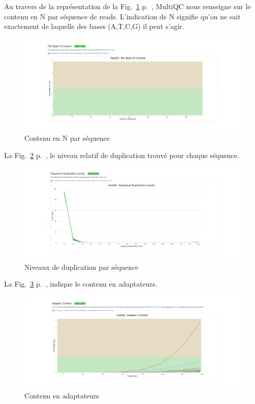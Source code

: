 \documentclass[a4paper,11pt]{article}
\begin{document}
Au travers de la représentation de la Fig.~\ref{fig-MultiQC_Plots5}
p.~\pageref{fig-MultiQC_Plots5}, MultiQC nous renseigne sur le contenu
en \og{}N\fg{} par séquence de reads. L'indication de N signifie qu'on
ne sait exactement de laquelle des bases (A,T,C,G) il peut s'agir.

\begin{figure}
  \begin{center}
    \includegraphics[width=16cm]{Images/MultiQC_Plots5}
  \end{center}
  \caption{Contenu en \og{}N\fg{} par séquence}
  \label{fig-MultiQC_Plots5}
\end{figure}

La Fig.~\ref{fig-MultiQC_Plots6} p.~\pageref{fig-MultiQC_Plots6}, le
niveau relatif de duplication trouvé pour chaque séquence.

\begin{figure}
  \begin{center}
    \includegraphics[width=16cm]{Images/MultiQC_Plots6}
  \end{center}
  \caption{Niveaux de duplication par séquence}
  \label{fig-MultiQC_Plots6}
\end{figure}

La Fig.~\ref{fig-MultiQC_Plots7} p.~\pageref{fig-MultiQC_Plots7},
indique le contenu en adaptateurs.

\begin{figure}
  \begin{center}
    \includegraphics[width=16cm]{Images/MultiQC_Plots7}
  \end{center}
  \caption{Contenu en adaptateurs}
  \label{fig-MultiQC_Plots7}
\end{figure}
\end{document}
